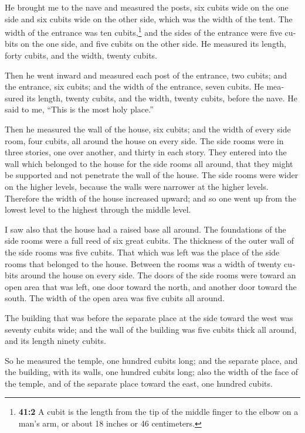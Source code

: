 \begin{paracol}{2}
\begin{otherlanguage}{english}
 He brought me to the nave and measured the posts, six
cubits wide on the one side and six cubits wide on the other side, which
was the width of the tent.  The width of the entrance was
ten cubits,\footnote{\textbf{41:2} A cubit is the length from the tip of
  the middle finger to the elbow on a man's arm, or about 18 inches or
  46 centimeters.} and the sides of the entrance were five cubits on the
one side, and five cubits on the other side. He measured its length,
forty cubits, and the width, twenty cubits.

 Then he went inward and measured each post of the
entrance, two cubits; and the entrance, six cubits; and the width of the
entrance, seven cubits.  He measured its length, twenty
cubits, and the width, twenty cubits, before the nave. He said to me,
``This is the most holy place.''

 Then he measured the wall of the house, six cubits; and
the width of every side room, four cubits, all around the house on every
side.  The side rooms were in three stories, one over
another, and thirty in each story. They entered into the wall which
belonged to the house for the side rooms all around, that they might be
supported and not penetrate the wall of the house.  The
side rooms were wider on the higher levels, because the walls were
narrower at the higher levels. Therefore the width of the house
increased upward; and so one went up from the lowest level to the
highest through the middle level.

 I saw also that the house had a raised base all around.
The foundations of the side rooms were a full reed of six great cubits.
 The thickness of the outer wall of the side rooms was
five cubits. That which was left was the place of the side rooms that
belonged to the house.  Between the rooms was a width of
twenty cubits around the house on every side.  The doors
of the side rooms were toward an open area that was left, one door
toward the north, and another door toward the south. The width of the
open area was five cubits all around.

 The building that was before the separate place at the
side toward the west was seventy cubits wide; and the wall of the
building was five cubits thick all around, and its length ninety cubits.

 So he measured the temple, one hundred cubits long; and
the separate place, and the building, with its walls, one hundred cubits
long;  also the width of the face of the temple, and of
the separate place toward the east, one hundred cubits.


\end{otherlanguage}
\end{paracol}
